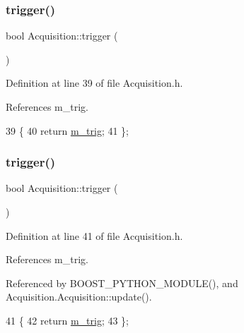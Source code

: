 \subsubsection{\texorpdfstring{trigger()}{trigger()}\hspace{0.1cm}{\footnotesize\ttfamily [1/2]}}
{\footnotesize\ttfamily bool Acquisition\+::trigger (\begin{DoxyParamCaption}{ }\end{DoxyParamCaption})\hspace{0.3cm}{\ttfamily [inline]}}



Definition at line 39 of file Acquisition.\+h.



References m\+\_\+trig.


\begin{DoxyCode}
39                  \{
40     \textcolor{keywordflow}{return} \hyperlink{classAcquisition_a953bdc1bf56206b6df33b648af32a24f}{m\_trig};
41   \};
\end{DoxyCode}
\mbox{\label{classAcquisition_a6f680938eb6a42d57dfa7466e8852af9}} 
\subsubsection{\texorpdfstring{trigger()}{trigger()}\hspace{0.1cm}{\footnotesize\ttfamily [2/2]}}
{\footnotesize\ttfamily bool Acquisition\+::trigger (\begin{DoxyParamCaption}{ }\end{DoxyParamCaption})\hspace{0.3cm}{\ttfamily [inline]}}



Definition at line 41 of file Acquisition.\+h.



References m\+\_\+trig.



Referenced by B\+O\+O\+S\+T\+\_\+\+P\+Y\+T\+H\+O\+N\+\_\+\+M\+O\+D\+U\+L\+E(), and Acquisition.\+Acquisition\+::update().


\begin{DoxyCode}
41                  \{
42     \textcolor{keywordflow}{return} \hyperlink{classAcquisition_a953bdc1bf56206b6df33b648af32a24f}{m\_trig};
43   \};
\end{DoxyCode}
\mbox{\label{classObject_a84f99f70f144a83e1582d1d0f84e4e62}} 
